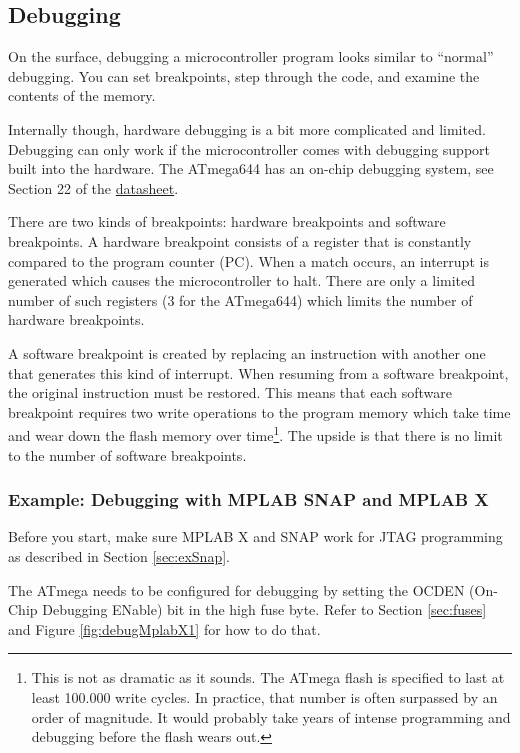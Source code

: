 \documentclass{article}
\newcommand{\datasheet}{\href{https://ww1.microchip.com/downloads/en/DeviceDoc/doc2593.pdf}{datasheet}}
\begin{document}
\subsection{Debugging}
On the surface, debugging a microcontroller program looks similar to ``normal'' debugging. You can set breakpoints, step through the code, and examine the contents of the memory. 

Internally though, hardware debugging is a bit more complicated and limited. Debugging can only work if the microcontroller comes with debugging support built into the hardware. The ATmega644 has an on-chip debugging system, see Section 22 of the \datasheet. 

There are two kinds of breakpoints: hardware breakpoints and software breakpoints. A hardware breakpoint consists of a register that is constantly compared to the program counter (PC). When a match occurs, an interrupt is generated which causes the microcontroller to halt. There are only a limited number of such registers (3 for the ATmega644) which limits the number of hardware breakpoints. 

A software breakpoint is created by replacing an instruction with another one that generates this kind of interrupt. When resuming from a software breakpoint, the original instruction must be restored. This means that each software breakpoint requires two write operations to the program memory which take time and wear down the flash memory over time\footnote{This is not as dramatic as it sounds. The ATmega flash is specified to last at least 100.000 write cycles. In practice, that number is often surpassed by an order of magnitude. It would probably take years of intense programming and debugging before the flash wears out.}. The upside is that there is no limit to the number of software breakpoints. 

\subsubsection{Example: Debugging with MPLAB SNAP and MPLAB X}
Before you start, make sure MPLAB X and SNAP work for JTAG programming as described in Section \ref{sec:exSnap}. 

The ATmega needs to be configured for debugging by setting the OCDEN (On-Chip Debugging ENable) bit in the high fuse byte. Refer to Section \ref{sec:fuses} and Figure \ref{fig:debugMplabX1} for how to do that. 
\end{document}
